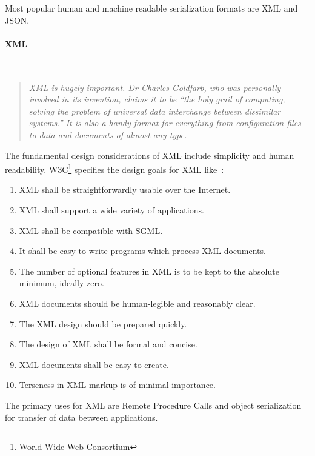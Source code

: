 Most popular human and machine readable serialization formats are XML and JSON.

\paragraph{XML} ~\\
\begin{quotation}
\textit{
XML is hugely important. Dr Charles Goldfarb, who was personally involved in its
invention, claims it to be “the holy grail of computing, solving the problem of universal data interchange between dissimilar systems.” It is also a handy format for everything from configuration files to data and documents of almost any type.
~\cite{xml_intro}}
\end{quotation} 

The fundamental design considerations of XML include
simplicity and human readability\cite{NurseitovPRI09}.
W3C\footnote{World Wide Web Consortium} specifies the design goals for XML
like~\cite{w3c_xml}:
\begin{enumerate}
  \item XML shall be straightforwardly usable over the Internet.
  \item XML shall support a wide variety of applications.
  \item XML shall be compatible with SGML\footnotemark.
  \item It shall be easy to write programs which process XML documents.
  \item The number of optional features in XML is to be kept to the absolute minimum, ideally zero.
  \item XML documents should be human-legible and reasonably clear.
  \item The XML design should be prepared quickly.
  \item The design of XML shall be formal and concise.
  \item XML documents shall be easy to create.
  \item Terseness in XML markup is of minimal importance.  
\end{enumerate}

The primary uses for XML are Remote Procedure Calls and object serialization for transfer of
data between applications. 

